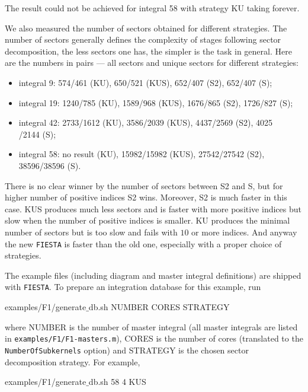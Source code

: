 \documentclass[preprint,12pt]{elsarticle}
\newenvironment{code}
  {\tt\noindent\begin{framed}\begin{flushleft}}
  {\end{flushleft}\end{framed}\normalfont}
\begin{document}
The result could not be achieved for integral 58 with strategy KU taking forever. 

We also measured the number of sectors obtained for different strategies. The number of sectors generally defines the complexity of stages following sector decomposition, the less sectors one has, the simpler is the task in general. Here are the numbers in pairs --- all sectors and unique sectors for different strategies:

\begin{itemize}
 \item integral  9: 574/461  (KU), 650/521 (KUS), 652/407 (S2), 652/407 (S);
 \item integral 19: 1240/785  (KU), 1589/968 (KUS), 1676/865 (S2), 1726/827 (S);
 \item integral 42: 2733/1612 (KU), 3586/2039 (KUS), 4437/2569 (S2), 4025\\/2144 (S);
 \item integral 58: no result (KU), 15982/15982 (KUS), 27542/27542 (S2), 38596/38596 (S).
\end{itemize}

There is no clear winner by the number of sectors between S2 and S, but for higher number of positive indices S2 wins. Moreover, S2 is much faster in this case. KUS produces much less sectors and is faster with more positive indices but slow when the number of positive indices is smaller. KU produces the minimal number of sectors but is too slow and fails with $10$ or more indices. And anyway the new {\tt FIESTA} is faster than the old one, especially with a proper choice of strategies.

The example files (including diagram and master integral definitions) are shipped with {\tt FIESTA}. To prepare an integration database for this example, run

\begin{code}
 examples/F1/generate$\_$db.sh NUMBER CORES STRATEGY
\end{code}

\noindent where NUMBER is the number of master integral (all master integrals are listed in {\tt examples/F1/F1-masters.m}), CORES is the number of cores (translated to the {\tt NumberOfSubkernels} option) and STRATEGY is the chosen sector decomposition strategy. For example,

\begin{code}
 examples/F1/generate$\_$db.sh 58 4 KUS
\end{code}
\end{document}

